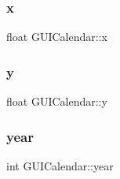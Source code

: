 \subsubsection{\texorpdfstring{x}{x}}
{\footnotesize\ttfamily float G\+U\+I\+Calendar\+::x}

\hypertarget{class_g_u_i_calendar_ab8e0fd6210fec52f86e610f6a49a43df}{}\label{class_g_u_i_calendar_ab8e0fd6210fec52f86e610f6a49a43df} 
\subsubsection{\texorpdfstring{y}{y}}
{\footnotesize\ttfamily float G\+U\+I\+Calendar\+::y}

\hypertarget{class_g_u_i_calendar_ab3d9a88e28a1f1a509796b554a922233}{}\label{class_g_u_i_calendar_ab3d9a88e28a1f1a509796b554a922233} 
\subsubsection{\texorpdfstring{year}{year}}
{\footnotesize\ttfamily int G\+U\+I\+Calendar\+::year}

